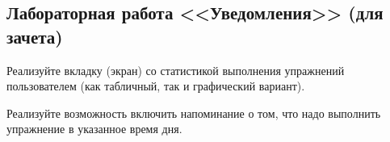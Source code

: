 \subsection{Лабораторная работа <<Уведомления>> (для зачета)}

Реализуйте вкладку (экран) со статистикой выполнения упражнений пользователем (как табличный, так и графический вариант).

Реализуйте возможность включить напоминание о том, что надо выполнить упражнение в указанное время дня.

